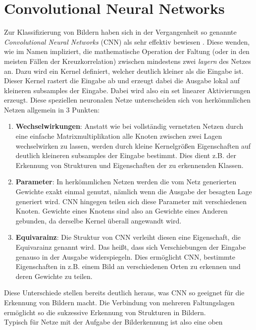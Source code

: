 {\let\clearpage\relax \chapter{Convolutional Neural Networks}\label{sec:netze}}

Zur Klassifizierung von Bildern haben sich in der Vergangenheit so genannte
\textit{Convolutional Neural Networks} (CNN) als sehr effektiv bewiesen \cite{goodfellow}.
Diese wenden, wie im Namen impliziert, die mathematische Operation der Faltung
(oder in den meisten Fällen der Kreuzkorrelation) zwischen mindestens zwei
\textit{layern} des Netzes an.
Dazu wird ein Kernel definiert, welcher deutlich kleiner als die Eingabe ist.
Dieser Kernel rastert die Eingabe ab und erzeugt dabei die Ausgabe lokal auf
kleineren subsamples der Eingabe. Dabei wird also ein set linearer Aktivierungen
erzeugt.
Diese speziellen neuronalen Netze unterscheiden sich von herkömmlichen Netzen
allgemein in 3 Punkten:
%
\begin{enumerate}
  \item \textbf{Wechselwirkungen}: Anstatt wie bei vollständig vernetzten
  Netzen durch eine einfache Matrixmultiplikation alle Knoten zwischen zwei
  Lagen wechselwirken zu lassen, werden durch kleine Kernelgrößen
  Eigenschaften auf deutlich kleineren subsamples der Eingabe bestimmt. Dies dient
  z.B. der Erkennung von Strukturen und Eigenschaften der zu erkennenden Klassen.
  \item \textbf{Parameter}: In herkömmlichen Netzen werden die vom Netz
  generierten Gewichte exakt einmal genutzt, nämlich wenn die Ausgabe der
  besagten Lage generiert wird. CNN hingegen teilen sich diese Parameter mit
  verschiedenen Knoten. Gewichte eines Knotens sind also an Gewichte eines
  Anderen gebunden, da derselbe Kernel überall angewandt wird.
  \item \textbf{Equivarainz}: Die Struktur von CNN verleiht diesen eine
  Eigenschaft, die Equivarainz genannt wird. Das heißt, dass sich
  Verschiebungen der Eingabe genauso in der Ausgabe widerspiegeln. Dies ermöglicht
  CNN, bestimmte Eigenschaften in z.B. einem Bild an verschiedenen Orten zu erkennen
  und deren Gewichte zu teilen.
\end{enumerate}
%
Diese Unterschiede stellen bereits deutlich heraus, was CNN so geeignet für die
Erkennung von Bildern macht. Die Verbindung von mehreren Faltungslagen
ermöglicht so die sukzessive Erkennung von Strukturen in Bildern. \\
Typisch für Netze mit der Aufgabe der Bilderkennung ist also eine oben
